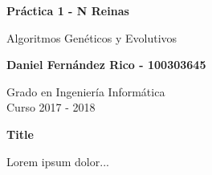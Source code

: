 \documentclass[12pt]{article}
\begin{document}
  \begin{titlepage}
    \begin{center}
        \vspace*{1cm}
        
        \Huge
        \textbf{Práctica 1 - N Reinas}

        \vspace{0.5cm}

        \huge
        Algoritmos Genéticos y Evolutivos
        
        
        \vspace{1.5cm}
        
        \large
        \textbf{Daniel Fernández Rico - 100303645}
        
        \large
        Grado en Ingeniería Informática\\
        Curso 2017 - 2018\\

    \end{center}
  \end{titlepage}

  \begin{center}
    \Large
    \textbf{Title}
    
    \vspace{0.4cm}
    
  \end{center}

  Lorem ipsum dolor...
\end{document}
